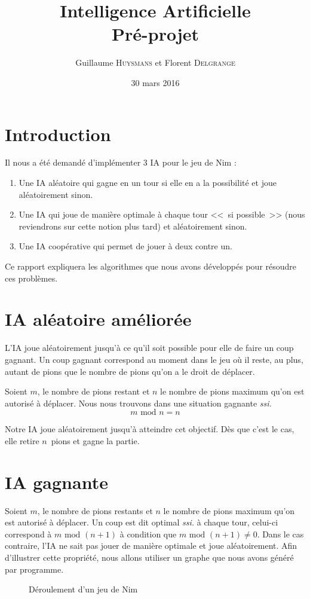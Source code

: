 \documentclass[10pt,a4paper]{article}
\author{Guillaume \textsc{Huysmans} et Florent \textsc{Delgrange}}
\title{Intelligence Artificielle\\Pré-projet}
\date{30 mars 2016}
\newcommand{\ssi}{\textit{ssi. }}
\renewcommand{\mod}{\text{ mod }}
\begin{document}
\maketitle
\section{Introduction}
Il nous a été demandé d'implémenter 3 IA pour le jeu de Nim :
\begin{enumerate}
\item Une IA aléatoire qui gagne en un tour si elle en a la possibilité et joue
	aléatoirement sinon.
\item Une IA qui joue de manière optimale à chaque tour <<~si possible~>>
	(nous reviendrons sur cette notion plus tard) et aléatoirement sinon.
\item Une IA coopérative qui permet de jouer à deux contre un.
\end{enumerate}

Ce rapport expliquera les algorithmes que nous avons développés
pour résoudre ces problèmes.

\section{IA aléatoire améliorée}
L'IA joue aléatoirement jusqu'à ce qu'il soit possible pour elle de faire un
coup gagnant. Un coup gagnant correspond au moment dans le jeu où il reste, au
plus, autant de pions que le nombre de pions qu'on a le droit de déplacer.

Soient $m$, le nombre de pions restant et $n$ le nombre de pions maximum qu'on
est autorisé à déplacer. Nous nous trouvons dans une situation gagnante \ssi
\[m \mod n = n\]

Notre IA joue aléatoirement jusqu'à atteindre cet objectif.
Dès que c'est le cas, elle retire $n$~pions et gagne la partie.

\section{IA gagnante}
Soient $m$, le nombre de pions restants et $n$ le nombre de pions maximum qu'on
est autorisé à déplacer. Un coup est dit optimal \ssi à chaque tour,
celui-ci correspond à $m \mod (n+1)$ à condition que $m \mod (n+1) \neq 0$.
Dans le cas contraire, l'IA ne sait pas jouer de manière optimale et joue
aléatoirement.
Afin d'illustrer cette propriété, nous allons utiliser un
graphe que nous avons généré par programme.
\begin{figure}
\label{nim12}
\caption{Déroulement d'un jeu de Nim}
\end{figure}
\end{document}
